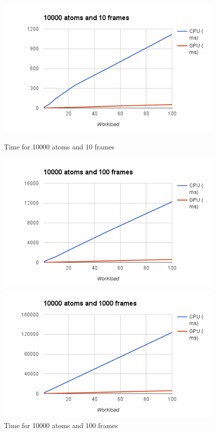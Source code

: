 \documentclass[12pt,letterpaper]{report}
\begin{document}
\begin{figure}[!tbp]
  \centering
  \begin{minipage}[b]{0.4\textwidth}
    \includegraphics[width=\textwidth]{images/exp_10000_10}
    \caption{Time for 10000 atoms and 10 frames}
    \label{fg:exp_10000_10}
  \end{minipage}
  \hfill
  \begin{minipage}[b]{0.4\textwidth}
    \includegraphics[width=\textwidth]{images/exp_10000_100}
    \caption{Time for 10000 atoms and 100 frames}
     \label{fg:exp_10000_100}
  \end{minipage}
\hfill
  \begin{minipage}[b]{0.4\textwidth}
    \includegraphics[width=\textwidth]{images/exp_10000_1000}

\end{minipage}
\end{figure}
\end{document}
